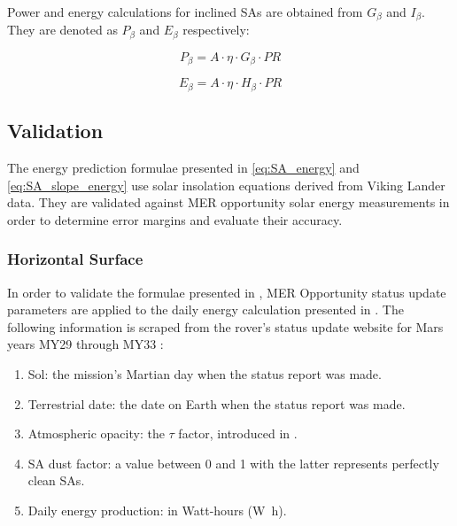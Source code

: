 Power and energy calculations for inclined \acp{SA} are obtained from $G_{\beta}$ and $I_{\beta}$. They are denoted as $P_{\beta}$ and $E_{\beta}$ respectively:

\begin{equation}
  \label{eq:SA_slope_power}
  P_{\beta} = A \cdot \eta \cdot G_{\beta} \cdot PR
\end{equation}


\begin{equation}
  \label{eq:SA_slope_energy}
  E_{\beta} = A \cdot \eta \cdot H_{\beta} \cdot PR
\end{equation}

\subsection{Validation}
\label{sec:PowerAndEnergyPredictions:Validation}
The energy prediction formulae presented in \ref{eq:SA_energy} and \ref{eq:SA_slope_energy} use solar insolation equations derived from Viking Lander data. They are validated against \ac{MER} opportunity solar energy measurements in order to determine error margins and evaluate their accuracy.

\subsubsection{Horizontal Surface}
\label{sec:PowerAndEnergyPredictions:Validation:HorizontalSurface}

In order to validate the formulae presented in , \ac{MER} Opportunity status update parameters are applied to the daily energy calculation presented in . The following information is scraped from the rover's status update website for Mars years \ac{MY}29 through \ac{MY}33  :

\begin{enumerate}[label=\textcolor{BulletBlue}{(\alph*)}]
  \item Sol: the mission's Martian day when the status report was made.
  \item Terrestrial date: the date on Earth when the status report was made.
  \item Atmospheric opacity: the $\tau$ factor, introduced in  .
  \item \ac{SA} dust factor: a value between 0 and 1 with the latter represents perfectly clean \acp{SA}.
  \item Daily energy production: in Watt-hours (\si{\watt\hour}).
\end{enumerate}

